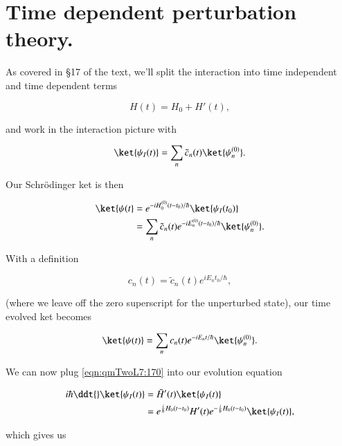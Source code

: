 \section{Time dependent perturbation theory.}

As covered in \S 17 of the text, we'll split the interaction into time independent and time dependent terms

\begin{equation}\label{eqn:qmTwoL7:150}
H(t) = H_0 + H'(t),
\end{equation}

and work in the interaction picture with

\begin{equation}\label{eqn:qmTwoL7:170}
\ket{\psi_I(t)} = \sum_n \tilde{c}_n(t) \ket{\psi_n^{(0)} }.
\end{equation}

Our Schr\"{o}dinger ket is then

\begin{equation}\label{eqn:qmTwoL7:190}
\begin{aligned}
\ket{\psi(t}
&=
e^{-i H_0^{(0)}(t- t_0)/\hbar}
\ket{\psi_I(t_0) } \\
&=
\sum_n \tilde{c}_n(t)
e^{-i E_n^{(0)}(t- t_0)/\hbar}
\ket{\psi_n^{(0)} }.
\end{aligned}
\end{equation}

With a definition

\begin{equation}\label{eqn:qmTwoL7:210}
c_n(t) = \tilde{c}_n(t) e^{i E_n t_0/\hbar},
\end{equation}

(where we leave off the zero superscript for the unperturbed state), our time evolved ket becomes

\begin{equation}\label{eqn:qmTwoL7:230}
\ket{\psi(t)}
=
\sum_n c_n(t)
e^{-i E_n t/\hbar}
\ket{\psi_n^{(0)} }.
\end{equation}

We can now plug \ref{eqn:qmTwoL7:170} into our evolution equation

\begin{align*}
i\hbar \ddt{} \ket{\psi_I(t)}
&=
\bar{H}'(t) \ket{\psi_I(t)} \\
&=
e^{\frac{i}{\hbar} H_0(t - t_0)} H'(t) e^{-\frac{i}{\hbar} H_0(t - t_0)}
\ket{\psi_I(t)},
\end{align*}

which gives us

